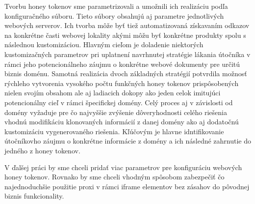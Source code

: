\documentclass[conference, 11pt,slovak,a4paper,twoside]{IEEEtran}
\begin{document}
Tvorbu honey tokenov sme parametrizovali a umožnili ich realizáciu podľa konfiguračného súboru. Tieto súbory obsahujú aj parametre jednotlivých webových serverov. Ich tvorba môže byť tiež automatizovaná získavaním odkazov na konkrétne časti webovej lokality akými môžu byť konkrétne produkty spolu s následnou kustomizáciou. Hlavným cieľom je doladenie niektorých kustomizačných parametrov pri uplatnení navrhnutej stratégie lákania útočníka v rámci jeho potencionálneho záujmu o konkrétne webové dokumenty pre určitú biznis doménu. Samotná realizácia dvoch základných stratégií potvrdila možnosť rýchleho vytvorenia vysokého počtu funkčných honey tokenov prispôsobených nielen svojím obsahom ale aj ladiacich dokopy ako jeden celok imitujúci potencionálny cieľ v rámci špecifickej domény. Celý proces aj v závislosti od domény vyžaduje pre čo najvyššie zvýšenie dôveryhodnosti celého riešenia vhodnú modifikáciu klonovaných informácií z danej domény ako aj dodatočnú kustomizáciu vygenerovaného riešenia. Kľúčovým je hlavne idntifikovanie útočníkovho záujmu o konkrétne informácie z domény a ich následné zahrnutie do jedného z honey tokenov.

V ďalšej práci by sme chceli pridať viac parametrov pre konfiguráciu webových honey tokenov. Rovnako by sme chceli vhodným spôsobom zabezpečiť čo najednoduchšie použitie proxi v rámci iframe elementov bez zásahov do pôvodnej biznis funkcionality. 


\end{document}
